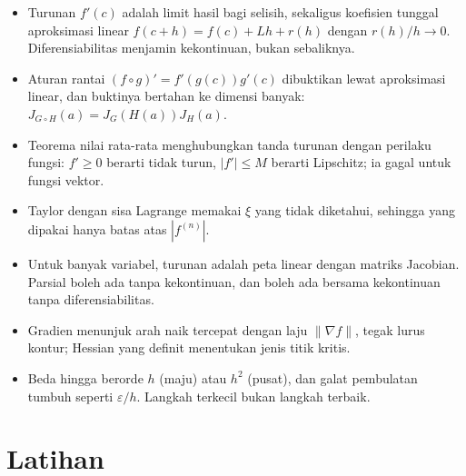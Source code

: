 \begin{ringkasan}
\begin{itemize}
  \item Turunan $f'(c)$ adalah limit hasil bagi selisih, sekaligus koefisien tunggal
        aproksimasi linear $f(c+h)=f(c)+Lh+r(h)$ dengan $r(h)/h\to0$. Diferensiabilitas
        menjamin kekontinuan, bukan sebaliknya.
  \item Aturan rantai $(f\circ g)'=f'(g(c))g'(c)$ dibuktikan lewat aproksimasi linear, dan
        buktinya bertahan ke dimensi banyak: $J_{G\circ H}(a)=J_{G}(H(a))J_{H}(a)$.
  \item Teorema nilai rata-rata menghubungkan tanda turunan dengan perilaku fungsi: $f'\ge0$
        berarti tidak turun, $|f'|\le M$ berarti Lipschitz; ia gagal untuk fungsi vektor.
  \item Taylor dengan sisa Lagrange memakai $\xi$ yang tidak diketahui, sehingga yang dipakai
        hanya batas atas $|f^{(n)}|$.
  \item Untuk banyak variabel, turunan adalah peta linear dengan matriks Jacobian. Parsial
        boleh ada tanpa kekontinuan, dan boleh ada bersama kekontinuan tanpa
        diferensiabilitas.
  \item Gradien menunjuk arah naik tercepat dengan laju $\|\nabla f\|$, tegak lurus kontur;
        Hessian yang definit menentukan jenis titik kritis.
  \item Beda hingga berorde $h$ (maju) atau $h^{2}$ (pusat), dan galat pembulatan tumbuh
        seperti $\varepsilon/h$. Langkah terkecil bukan langkah terbaik.
\end{itemize}
\end{ringkasan}

\section{Latihan}

